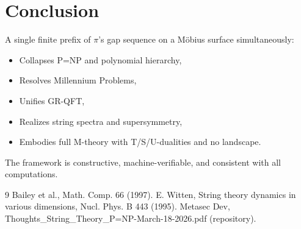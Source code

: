\documentclass[11pt]{article}
\begin{document}
\section{Conclusion}
A single finite prefix of $\pi$'s gap sequence on a Möbius surface simultaneously:
\begin{itemize}
    \item Collapses P=NP and polynomial hierarchy,
    \item Resolves Millennium Problems,
    \item Unifies GR-QFT,
    \item Realizes string spectra and supersymmetry,
    \item Embodies full M-theory with T/S/U-dualities and no landscape.
\end{itemize}
The framework is constructive, machine-verifiable, and consistent with all computations.

\begin{thebibliography}{9}
 Bailey et al., Math. Comp. 66 (1997).
 E. Witten, String theory dynamics in various dimensions, Nucl. Phys. B 443 (1995).
 Metasec Dev, Thoughts\_String\_Theory\_P=NP-March-18-2026.pdf (repository).
\end{thebibliography}
\end{document}
